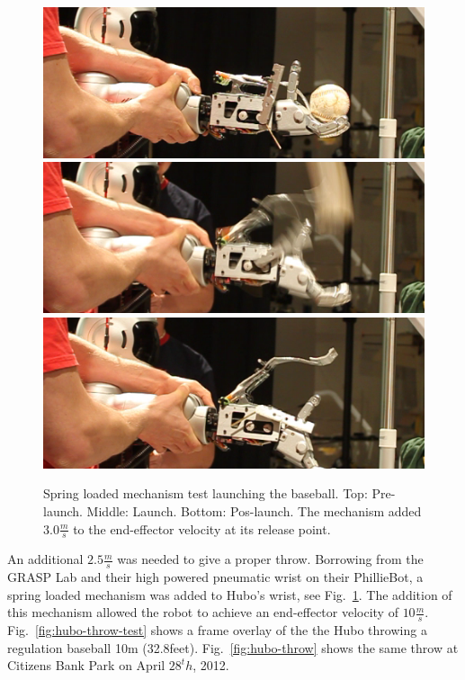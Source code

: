 \begin{figure}[t]
  \centering
\includegraphics[width=1.0\columnwidth]{./pix/finalSpring1.png}
\includegraphics[width=1.0\columnwidth]{./pix/finalSpring2.png}
\includegraphics[width=1.0\columnwidth]{./pix/finalSpring3.png}
  \caption{Spring loaded mechanism test launching the baseball.  Top: Pre-launch.  Middle: Launch.  Bottom: Pos-launch.  The mechanism added $3.0\frac{m}{s}$ to the end-effector velocity at its release point.}
  \label{fig:hubo-spring}
\end{figure}

An additional $2.5\frac{m}{s}$ was needed to give a proper throw.  
Borrowing from the GRASP Lab and their high powered pneumatic wrist on their PhillieBot, a spring loaded mechanism was added to Hubo's wrist, see Fig.~\ref{fig:hubo-spring}.
The addition of this mechanism allowed the robot to achieve an end-effector velocity of $10\frac{m}{s}$.
Fig.~\ref{fig:hubo-throw-test} shows a frame overlay of the the Hubo throwing a regulation baseball 10m (32.8feet).
Fig.~\ref{fig:hubo-throw} shows the same throw at Citizens Bank Park on April $28^th$, 2012.


